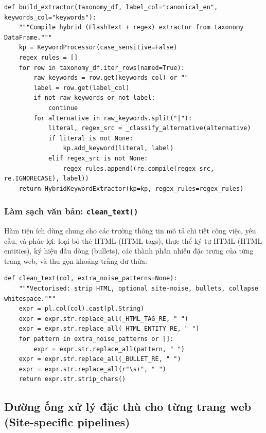 \begin{lstlisting}[style=pystyle, caption={Bộ trích xuất lai FlashText và regex kết hợp}, label={lst:build-extractor}]
def build_extractor(taxonomy_df, label_col="canonical_en", keywords_col="keywords"):
    """Compile hybrid (FlashText + regex) extractor from taxonomy DataFrame."""
    kp = KeywordProcessor(case_sensitive=False)
    regex_rules = []
    for row in taxonomy_df.iter_rows(named=True):
        raw_keywords = row.get(keywords_col) or ""
        label = row.get(label_col)
        if not raw_keywords or not label:
            continue
        for alternative in raw_keywords.split("|"):
            literal, regex_src = _classify_alternative(alternative)
            if literal is not None:
                kp.add_keyword(literal, label)
            elif regex_src is not None:
                regex_rules.append((re.compile(regex_src, re.IGNORECASE), label))
    return HybridKeywordExtractor(kp=kp, regex_rules=regex_rules)
\end{lstlisting}

\subsubsection{Làm sạch văn bản: \texttt{clean\_text()}}

Hàm tiện ích dùng chung cho các trường thông tin mô tả chi tiết công việc, yêu cầu, và phúc lợi:
loại bỏ thẻ HTML (HTML tags), thực thể ký tự HTML (HTML entities), ký hiệu đầu dòng (bullets), các thành phần nhiễu đặc trưng của từng trang web, và thu gọn khoảng trắng dư thừa:

\begin{lstlisting}[style=pystyle, caption={Làm sạch văn bản: bỏ thẻ HTML, ký hiệu đầu dòng, và các thành phần nhiễu}, label={lst:clean-text}]
def clean_text(col, extra_noise_patterns=None):
    """Vectorised: strip HTML, optional site-noise, bullets, collapse whitespace."""
    expr = pl.col(col).cast(pl.String)
    expr = expr.str.replace_all(_HTML_TAG_RE, " ")
    expr = expr.str.replace_all(_HTML_ENTITY_RE, " ")
    for pattern in extra_noise_patterns or []:
        expr = expr.str.replace_all(pattern, " ")
    expr = expr.str.replace_all(_BULLET_RE, " ")
    expr = expr.str.replace_all(r"\s+", " ")
    return expr.str.strip_chars()
\end{lstlisting}

\subsection{Đường ống xử lý đặc thù cho từng trang web (Site-specific pipelines)}
\label{subsec:site-pipelines}

